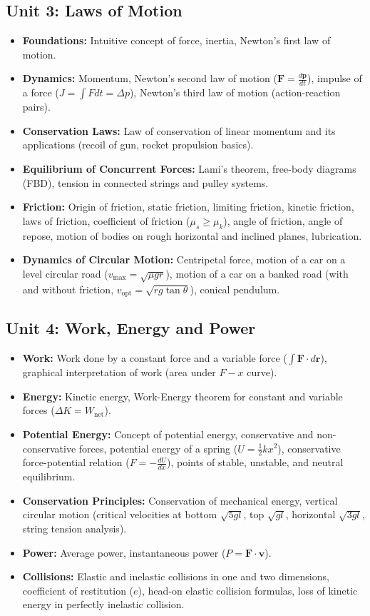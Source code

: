 \documentclass[11pt,a4paper]{article}
\begin{document}
\subsection{Unit 3: Laws of Motion}
\begin{itemize}
  \item \textbf{Foundations:} Intuitive concept of force, inertia, Newton's first law of motion.
  \item \textbf{Dynamics:} Momentum, Newton's second law of motion ($\mathbf{F}=\frac{d\mathbf{p}}{dt}$), impulse of a force ($J = \int F dt = \Delta p$), Newton's third law of motion (action-reaction pairs).
  \item \textbf{Conservation Laws:} Law of conservation of linear momentum and its applications (recoil of gun, rocket propulsion basics).
  \item \textbf{Equilibrium of Concurrent Forces:} Lami's theorem, free-body diagrams (FBD), tension in connected strings and pulley systems.
  \item \textbf{Friction:} Origin of friction, static friction, limiting friction, kinetic friction, laws of friction, coefficient of friction ($\mu_s \ge \mu_k$), angle of friction, angle of repose, motion of bodies on rough horizontal and inclined planes, lubrication.
  \item \textbf{Dynamics of Circular Motion:} Centripetal force, motion of a car on a level circular road ($v_{\max} = \sqrt{\mu g r}$), motion of a car on a banked road (with and without friction, $v_{\text{opt}} = \sqrt{rg\tan\theta}$), conical pendulum.
\end{itemize}

\subsection{Unit 4: Work, Energy and Power}
\begin{itemize}
  \item \textbf{Work:} Work done by a constant force and a variable force ($\int \mathbf{F}\cdot d\mathbf{r}$), graphical interpretation of work (area under $F-x$ curve).
  \item \textbf{Energy:} Kinetic energy, Work-Energy theorem for constant and variable forces ($\Delta K = W_{\text{net}}$).
  \item \textbf{Potential Energy:} Concept of potential energy, conservative and non-conservative forces, potential energy of a spring ($U = \frac{1}{2}kx^2$), conservative force-potential relation ($F = -\frac{dU}{dx}$), points of stable, unstable, and neutral equilibrium.
  \item \textbf{Conservation Principles:} Conservation of mechanical energy, vertical circular motion (critical velocities at bottom $\sqrt{5gl}$, top $\sqrt{gl}$, horizontal $\sqrt{3gl}$, string tension analysis).
  \item \textbf{Power:} Average power, instantaneous power ($P = \mathbf{F}\cdot\mathbf{v}$).
  \item \textbf{Collisions:} Elastic and inelastic collisions in one and two dimensions, coefficient of restitution ($e$), head-on elastic collision formulas, loss of kinetic energy in perfectly inelastic collision.
\end{itemize}
\end{document}
